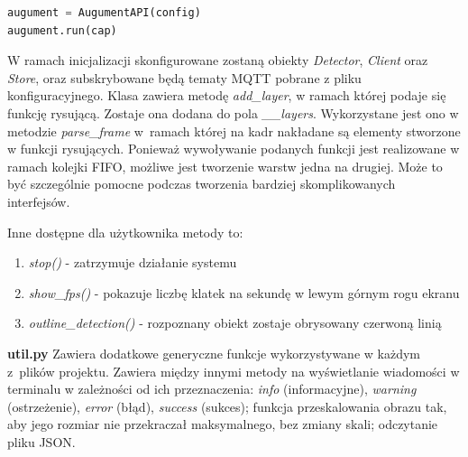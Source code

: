 \documentclass[12pt,twoside,polish]{article}
\begin{document}
\begin{lstlisting}[language=Python, label=aug, caption=Tworzenie oraz uruchomienie systemu AR]
augument = AugumentAPI(config)
augument.run(cap)
\end{lstlisting}

W ramach inicjalizacji skonfigurowane zostaną obiekty \emph{Detector}, \emph{Client} oraz \emph{Store}, oraz subskrybowane będą tematy MQTT pobrane z pliku konfiguracyjnego. Klasa zawiera metodę \emph{add\_layer}, w ramach której podaje się funkcję rysującą. Zostaje ona dodana do pola \emph{\_\_layers}. Wykorzystane jest ono w metodzie \emph{parse\_frame} w~ramach której na kadr nakładane są elementy stworzone w funkcji rysujących. Ponieważ wywoływanie podanych funkcji jest realizowane w ramach kolejki FIFO, możliwe jest tworzenie warstw jedna na drugiej. Może to być szczególnie pomocne podczas tworzenia bardziej skomplikowanych interfejsów.

Inne dostępne dla użytkownika metody to:
\begin{enumerate}[label=\alph*), leftmargin=1.25cm]
	\item \emph{stop()} - zatrzymuje działanie systemu
	\item \emph{show\_fps()} - pokazuje liczbę klatek na sekundę w lewym górnym rogu ekranu
	\item \emph{outline\_detection()} - rozpoznany obiekt zostaje obrysowany czerwoną linią
\end{enumerate}

\textbf{util.py}
Zawiera dodatkowe generyczne funkcje wykorzystywane w każdym z~plików projektu. Zawiera między innymi metody na wyświetlanie wiadomości w terminalu w zależności od ich przeznaczenia: \emph{info} (informacyjne), \emph{warning} (ostrzeżenie), \emph{error} (błąd), \emph{success} (sukces); funkcja przeskalowania obrazu tak, aby jego rozmiar nie przekraczał maksymalnego, bez zmiany skali; odczytanie pliku JSON.
\end{document}
